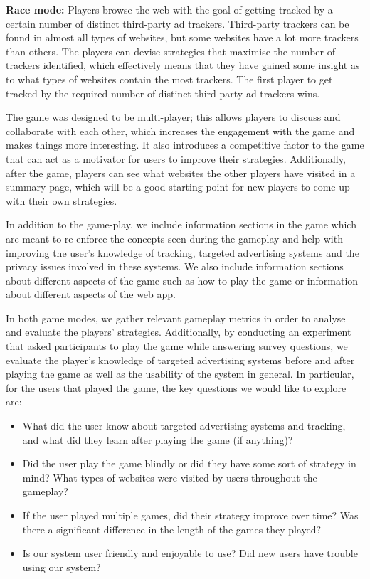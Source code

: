 \documentclass{l4proj}
\begin{document}
\textbf{Race mode:} Players browse the web with the goal of getting tracked by a certain number of distinct third-party ad trackers. Third-party trackers can be found in almost all types of websites, but some websites have a lot more trackers than others. The players can devise strategies that maximise the number of trackers identified, which effectively means that they have gained some insight as to what types of websites contain the most trackers. The first player to get tracked by the required number of distinct third-party ad trackers wins.

The game was designed to be multi-player; this allows players to discuss and collaborate with each other, which increases the engagement with the game and makes things more interesting. It also introduces a competitive factor to the game that can act as a motivator for users to improve their strategies. Additionally, after the game, players can see what websites the other players have visited in a summary page, which will be a good starting point for new players to come up with their own strategies.

In addition to the game-play, we include information sections in the game which are meant to re-enforce the concepts seen during the gameplay and help with improving the user's knowledge of tracking, targeted advertising systems and the privacy issues involved in these systems. We also include information sections about different aspects of the game such as how to play the game or information about different aspects of the web app.     

In both game modes, we gather relevant gameplay metrics in order to analyse and evaluate the players' strategies. Additionally, by conducting an experiment that asked participants to play the game while answering survey questions, we evaluate the player's knowledge of targeted advertising systems before and after playing the game as well as the usability of the system in general. In particular, for the users that played the game, the key questions we would like to explore are:
\begin{itemize}
    \item
    What did the user know about targeted advertising systems and tracking, and what did they learn after playing the game (if anything)?
    \item
    Did the user play the game blindly or did they have some sort of strategy in mind? What types of websites were visited by users throughout the gameplay?
    \item
    If the user played multiple games, did their strategy improve over time? Was there a significant difference in the length of the games they played? 
    \item
    Is our system user friendly and enjoyable to use? Did new users have trouble using our system?
\end{itemize}
\end{document}
